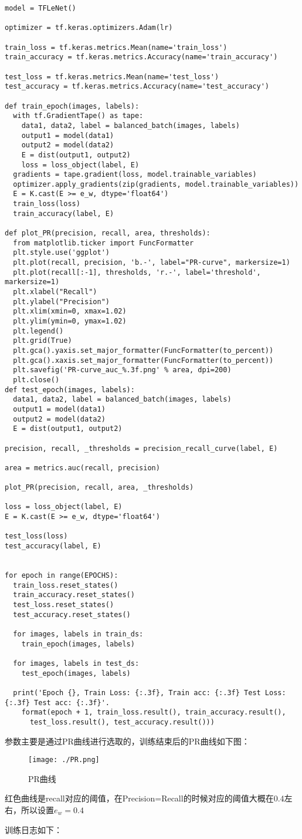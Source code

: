 \documentclass{article}
\begin{document}
\begin{lstlisting}
model = TFLeNet()

optimizer = tf.keras.optimizers.Adam(lr)

train_loss = tf.keras.metrics.Mean(name='train_loss')
train_accuracy = tf.keras.metrics.Accuracy(name='train_accuracy')

test_loss = tf.keras.metrics.Mean(name='test_loss')
test_accuracy = tf.keras.metrics.Accuracy(name='test_accuracy')

def train_epoch(images, labels):
  with tf.GradientTape() as tape:
    data1, data2, label = balanced_batch(images, labels)
    output1 = model(data1)
    output2 = model(data2)
    E = dist(output1, output2)
    loss = loss_object(label, E)
  gradients = tape.gradient(loss, model.trainable_variables)
  optimizer.apply_gradients(zip(gradients, model.trainable_variables))
  E = K.cast(E >= e_w, dtype='float64')
  train_loss(loss)
  train_accuracy(label, E)

def plot_PR(precision, recall, area, thresholds):
  from matplotlib.ticker import FuncFormatter
  plt.style.use('ggplot')
  plt.plot(recall, precision, 'b.-', label="PR-curve", markersize=1)
  plt.plot(recall[:-1], thresholds, 'r.-', label='threshold', markersize=1)
  plt.xlabel("Recall")
  plt.ylabel("Precision")
  plt.xlim(xmin=0, xmax=1.02)
  plt.ylim(ymin=0, ymax=1.02)
  plt.legend()
  plt.grid(True)
  plt.gca().yaxis.set_major_formatter(FuncFormatter(to_percent))
  plt.gca().xaxis.set_major_formatter(FuncFormatter(to_percent))
  plt.savefig('PR-curve_auc_%.3f.png' % area, dpi=200)
  plt.close()
def test_epoch(images, labels):
  data1, data2, label = balanced_batch(images, labels)
  output1 = model(data1)
  output2 = model(data2)
  E = dist(output1, output2)

precision, recall, _thresholds = precision_recall_curve(label, E)

area = metrics.auc(recall, precision)

plot_PR(precision, recall, area, _thresholds)

loss = loss_object(label, E)
E = K.cast(E >= e_w, dtype='float64')

test_loss(loss)
test_accuracy(label, E)


for epoch in range(EPOCHS):
  train_loss.reset_states()
  train_accuracy.reset_states()
  test_loss.reset_states()
  test_accuracy.reset_states()

  for images, labels in train_ds:
    train_epoch(images, labels)

  for images, labels in test_ds:
    test_epoch(images, labels)

  print('Epoch {}, Train Loss: {:.3f}, Train acc: {:.3f} Test Loss: {:.3f} Test acc: {:.3f}'.
    format(epoch + 1, train_loss.result(), train_accuracy.result(),
      test_loss.result(), test_accuracy.result()))

\end{lstlisting}

参数主要是通过PR曲线进行选取的，训练结束后的PR曲线如下图：

\begin{figure}[H]
	\centering
	\texttt{[image: ./PR.png]}
	\caption{PR曲线} \label{fig:aa}
\end{figure}

红色曲线是recall对应的阈值，在Precision=Recall的时候对应的阈值大概在0.4左右，所以设置$e_w=0.4$

训练日志如下：
\end{document}
